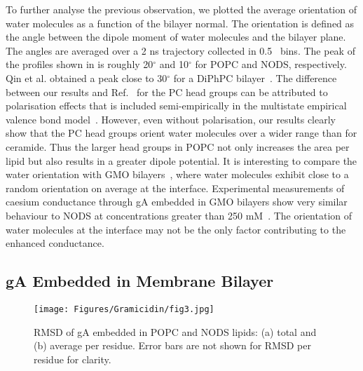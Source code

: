 To further analyse the previous observation, we plotted the average orientation of water molecules 
as a function of the bilayer normal. The orientation is defined as the angle between the dipole 
moment of water molecules and the bilayer plane. The angles are averaged over a 2 ns trajectory 
collected in 0.5 \angs\ bins. The peak of the profiles shown in  is roughly 
20$^{\circ}$ and 10$^{\circ}$ for POPC and NODS, respectively. Qin et al. obtained a peak 
close to 30$^{\circ}$ for a DiPhPC bilayer~\cite{Qin2007}. The difference between our results and 
Ref.~\cite{Qin2007} for the PC head groups can be attributed to polarisation effects that is 
included semi-empirically in the multistate empirical valence bond model~\cite{Schmitt1998}. However, 
even without polarisation, our results clearly show that the PC head groups orient water molecules 
over a wider range than for ceramide. Thus the larger head groups in POPC not only increases the 
area per lipid but also results in a greater dipole potential. It is interesting to compare the 
water orientation with GMO bilayers~\cite{Qin2007}, where water molecules exhibit close to a random 
orientation on average at the interface. Experimental measurements of caesium conductance through 
gA embedded in GMO bilayers show very similar behaviour to NODS at concentrations greater than 250 
mM~\cite{DeGodoy2011}. The orientation of water molecules at the interface may not be the only 
factor contributing to the enhanced conductance.

\subsection{gA Embedded in Membrane Bilayer}

\begin{figure}[b!]
 \centering
 \texttt{[image: Figures/Gramicidin/fig3.jpg]}
\caption{RMSD of gA embedded in POPC and NODS lipids: (a) total and (b) average per residue. 
Error bars are not shown for RMSD per residue for clarity.}
\label{gA:fig3}
\end{figure}

